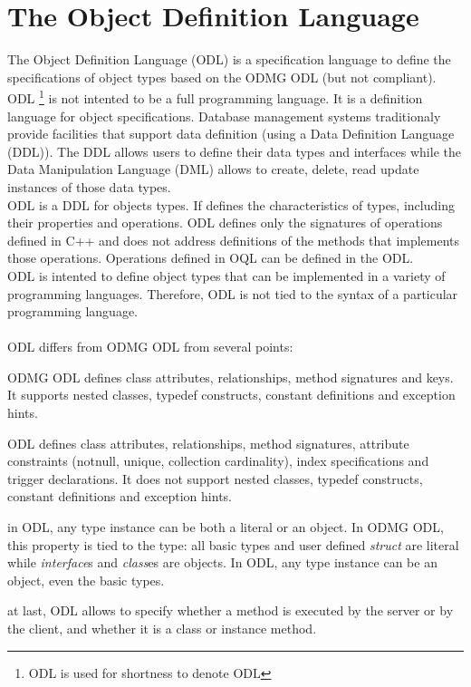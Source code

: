 

\newcommand{\mantitle}{\textsc{Object Definition Language}}


\tableofcontents

\chapter*{The Object Definition Language}

The \eyedb Object Definition Language (ODL) is a specification language
to define the specifications of object types based on the ODMG ODL (but not compliant).\\
ODL \footnote{ODL is used for shortness to denote \eyedb ODL} 
is not intented to be a full programming language. It is
a definition language for object specifications. Database management
systems traditionaly provide facilities that support
data definition (using a Data Definition Language (DDL)). The DDL allows
users to define their data types and interfaces while the
Data Manipulation Language (DML) allows to create, delete, read update
instances of those data types.\\
ODL is a DDL for objects types.
If defines the characteristics of types, including their properties
and operations.
ODL defines only the signatures of operations defined in C++ and does not
address definitions of the methods that implements those operations.
Operations defined in OQL can be defined in the ODL.
\\
ODL is intented to define object types that can be implemented
in a variety of programming languages. Therefore, ODL is not tied
to the syntax of a particular programming language.\\\\
\eyedb ODL differs from ODMG ODL from several points:
\bi
\item ODMG ODL defines class attributes, relationships, method signatures and keys.
It supports nested classes, typedef constructs, constant definitions and
exception hints.
\item \eyedb ODL defines class attributes, relationships, method signatures,
attribute constraints (notnull, unique, collection cardinality), index
specifications and trigger declarations. It does not support
nested classes, typedef constructs, constant definitions and
exception hints.
\item in \eyedb ODL, any type instance can be both a literal or
an object. In ODMG ODL, this property is tied to the type: all
basic types and user defined \emph{struct} are literal while \emph{interface}s
and \emph{class}es are objects.
In \eyedb ODL, any type instance can be an object, even the basic types.
\item at last, \eyedb ODL allows to specify whether a method is executed by the server or by the client,
and whether it is a class or instance method.
\ei

